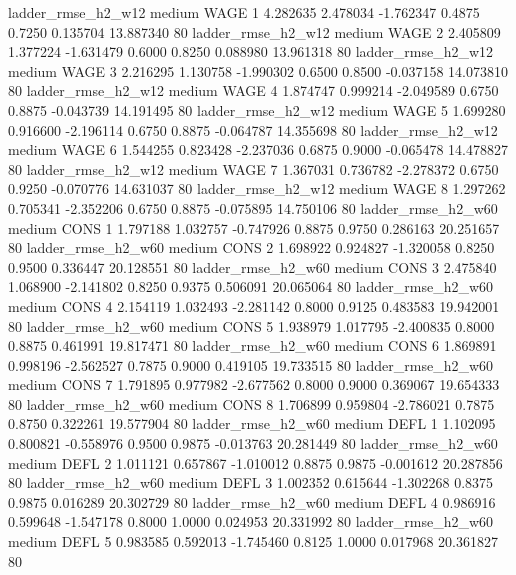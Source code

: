     ladder_rmse_h2_w12     medium     WAGE                 1  4.282635 2.478034 -1.762347 0.4875 0.7250  0.135704   13.887340 80
    ladder_rmse_h2_w12     medium     WAGE                 2  2.405809 1.377224 -1.631479 0.6000 0.8250  0.088980   13.961318 80
    ladder_rmse_h2_w12     medium     WAGE                 3  2.216295 1.130758 -1.990302 0.6500 0.8500 -0.037158   14.073810 80
    ladder_rmse_h2_w12     medium     WAGE                 4  1.874747 0.999214 -2.049589 0.6750 0.8875 -0.043739   14.191495 80
    ladder_rmse_h2_w12     medium     WAGE                 5  1.699280 0.916600 -2.196114 0.6750 0.8875 -0.064787   14.355698 80
    ladder_rmse_h2_w12     medium     WAGE                 6  1.544255 0.823428 -2.237036 0.6875 0.9000 -0.065478   14.478827 80
    ladder_rmse_h2_w12     medium     WAGE                 7  1.367031 0.736782 -2.278372 0.6750 0.9250 -0.070776   14.631037 80
    ladder_rmse_h2_w12     medium     WAGE                 8  1.297262 0.705341 -2.352206 0.6750 0.8875 -0.075895   14.750106 80
    ladder_rmse_h2_w60     medium     CONS                 1  1.797188 1.032757 -0.747926 0.8875 0.9750  0.286163   20.251657 80
    ladder_rmse_h2_w60     medium     CONS                 2  1.698922 0.924827 -1.320058 0.8250 0.9500  0.336447   20.128551 80
    ladder_rmse_h2_w60     medium     CONS                 3  2.475840 1.068900 -2.141802 0.8250 0.9375  0.506091   20.065064 80
    ladder_rmse_h2_w60     medium     CONS                 4  2.154119 1.032493 -2.281142 0.8000 0.9125  0.483583   19.942001 80
    ladder_rmse_h2_w60     medium     CONS                 5  1.938979 1.017795 -2.400835 0.8000 0.8875  0.461991   19.817471 80
    ladder_rmse_h2_w60     medium     CONS                 6  1.869891 0.998196 -2.562527 0.7875 0.9000  0.419105   19.733515 80
    ladder_rmse_h2_w60     medium     CONS                 7  1.791895 0.977982 -2.677562 0.8000 0.9000  0.369067   19.654333 80
    ladder_rmse_h2_w60     medium     CONS                 8  1.706899 0.959804 -2.786021 0.7875 0.8750  0.322261   19.577904 80
    ladder_rmse_h2_w60     medium     DEFL                 1  1.102095 0.800821 -0.558976 0.9500 0.9875 -0.013763   20.281449 80
    ladder_rmse_h2_w60     medium     DEFL                 2  1.011121 0.657867 -1.010012 0.8875 0.9875 -0.001612   20.287856 80
    ladder_rmse_h2_w60     medium     DEFL                 3  1.002352 0.615644 -1.302268 0.8375 0.9875  0.016289   20.302729 80
    ladder_rmse_h2_w60     medium     DEFL                 4  0.986916 0.599648 -1.547178 0.8000 1.0000  0.024953   20.331992 80
    ladder_rmse_h2_w60     medium     DEFL                 5  0.983585 0.592013 -1.745460 0.8125 1.0000  0.017968   20.361827 80
